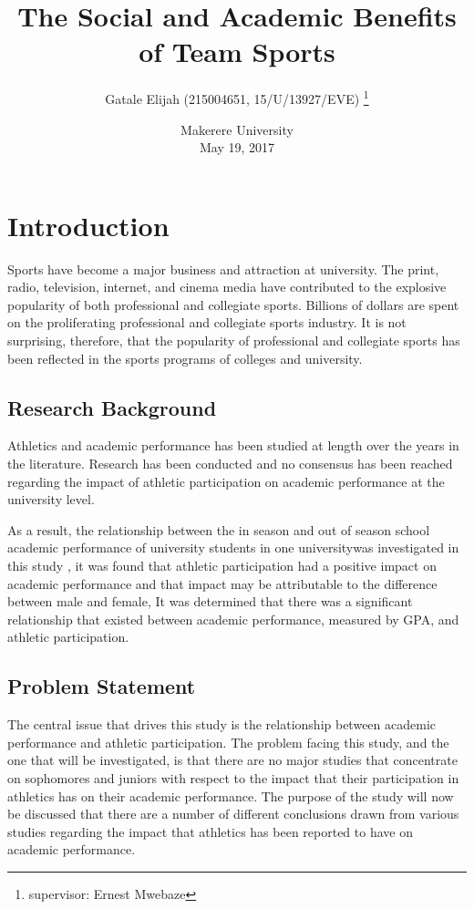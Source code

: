 \documentclass[options]{article}
\title{The Social and Academic Benefits of Team Sports}
\author{Gatale Elijah (215004651, 15/U/13927/EVE) \thanks{supervisor: Ernest Mwebaze}}
\date{%
    Makerere University\\%
    May 19, 2017
}
\begin{document}
\begin{titlepage}
\maketitle
\end{titlepage}





\section{\textbf{ Introduction}} 
Sports have become a major business and attraction at university. The
print, radio, television, internet, and cinema media have contributed to the explosive
popularity of both professional and collegiate sports. Billions of dollars are spent on the proliferating professional and collegiate sports industry. It is not surprising, therefore, that the popularity of professional and collegiate sports has been reflected in the sports programs of colleges and university.


\subsection{\textbf{Research Background}}
Athletics and academic performance has been studied at length over the years in
the literature. Research has been conducted and no consensus has been reached regarding the impact of athletic participation on academic performance at the university level. 
  \bigbreak

As a result, the relationship between the in season and out of season school academic performance of university students in one universitywas investigated in this study , it was found that athletic participation had a positive impact on academic performance and that impact may be attributable to the difference between male and female, It was determined that there was a significant relationship that existed between academic performance, measured by GPA, and athletic participation.  \bigbreak



\subsection{\textbf{Problem Statement}}
The central issue that drives this study is the relationship between academic
performance and athletic participation. The problem facing this study, and the one that will be investigated, is that there are no major studies that concentrate on sophomores and juniors with respect to the impact that their participation in athletics has on their academic performance. The purpose of the study
will now be discussed that there are a number of different conclusions drawn from various studies regarding the impact that athletics has been reported to have on academic performance.
\end{document}
